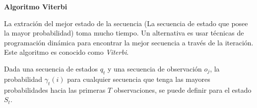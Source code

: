 



\vspace{1cm}


\textbf{Algoritmo Viterbi}

La extración del mejor estado de la secuencia (La secuencia de estado que posee la mayor probabilidad) toma mucho tiempo. Un alternativa es usar técnicas de programación dinámica para encontrar la mejor secuencia %
a través de la iteración. Este algoritmo es conocido como \emph{Viterbi}. 

Dada una secuencia de estados $q_{t}$ y una secuencia de observación  $o_{j}$, la probabilidad $\gamma_{t}(i)$ 
para cualquier secuencia que tenga las mayores probabilidades hacia  las primeras $T$ observaciones, se puede definir para el estado $S_{t}$.


